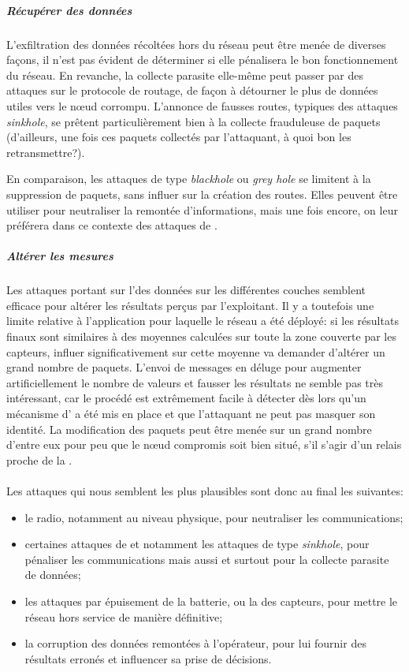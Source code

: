             \subparagraph{Récupérer des données}
L'exfiltration des données récoltées hors du réseau peut être menée de diverses façons, il n'est pas évident de déterminer si elle pénalisera le bon fonctionnement du réseau.
En revanche, la collecte parasite elle-même peut passer par des attaques sur le protocole de routage, de façon à détourner le plus de données utiles vers le nœud corrompu.
L'annonce de fausses routes, typiques des attaques \textit{sinkhole}, se prêtent particulièrement bien à la collecte frauduleuse de paquets (d'ailleurs, une fois ces paquets collectés par l'attaquant, à quoi bon les retransmettre?).

En comparaison, les attaques de type \textit{blackhole} ou \textit{grey hole} se limitent à la suppression de paquets, sans influer sur la création des routes.
Elles peuvent être utiliser pour neutraliser la remontée d'informations, mais une fois encore, on leur préférera dans ce contexte des attaques de .

            \subparagraph{Altérer les mesures}
Les attaques portant sur l'\integrite des données sur les différentes couches semblent efficace pour altérer les résultats perçus par l'exploitant.
Il y a toutefois une limite relative à l'application pour laquelle le réseau a été déployé: si les résultats finaux sont similaires à des moyennes calculées sur toute la zone couverte par les capteurs, influer significativement sur cette moyenne va demander d'altérer un grand nombre de paquets.
L'envoi de messages en déluge pour augmenter artificiellement le nombre de valeurs et fausser les résultats ne semble pas très intéressant, car le procédé est extrêmement facile à détecter dès lors qu'un mécanisme d' a été mis en place et que l'attaquant ne peut pas masquer son identité.
La modification des paquets peut être menée sur un grand nombre d'entre eux pour peu que le nœud compromis soit bien situé, \cad s'il s'agir d'un relais proche de la \sdb.

        \paragraph{}
Les attaques qui nous semblent les plus plausibles sont donc au final les suivantes:
\begin{itemize}
    \item le  radio, notamment au niveau physique, pour neutraliser les communications;
    \item certaines attaques de  et notamment les attaques de type \textit{sinkhole}, pour pénaliser les communications mais aussi et surtout pour la collecte parasite de données;
    \item les attaques par épuisement de la batterie, ou la  des capteurs, pour mettre le réseau hors service de manière définitive;
    \item la corruption des données remontées à l'opérateur, pour lui fournir des résultats erronés et influencer sa prise de décisions.
\end{itemize}

